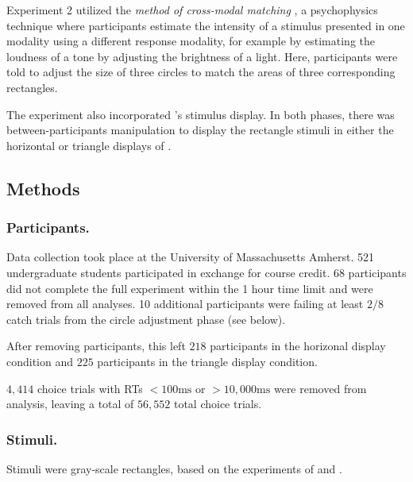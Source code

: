 Experiment 2 utilized the \textit{method of cross-modal matching} \parencite{stevensCrossmodalityMatchingBrightness1965}, a psychophysics technique where participants estimate the intensity of a stimulus presented in one modality using a different response modality, for example by estimating the loudness of a tone by adjusting the brightness of a light. Here, participants were told to adjust the size of three circles to match the areas of three corresponding rectangles. 

The experiment also incorporated \textcite{spektorWhenGoodLooks2018b}'s stimulus display. In both phases, there was between-participants manipulation to display the rectangle stimuli in either the horizontal or triangle displays of \textcite{spektorWhenGoodLooks2018b}.

\subsection{Methods}
\subsubsection{Participants.}
Data collection took place at the University of Massachusetts Amherst. 521 undergraduate students participated in exchange for course credit. 68 participants did not complete the full experiment within the 1 hour time limit and were removed from all analyses. 10 additional participants were failing at least $2/8$ catch trials from the circle adjustment phase (see below). 

After removing participants, this left $218$ participants in the horizonal display condition and $225$ participants in the triangle display condition. 

$4,414$ choice trials with RTs $<100\text{ms}$ or $>10,000\text{ms}$ were removed from analysis, leaving a total of $56,552$ total choice trials.

\subsubsection{Stimuli.}
Stimuli were gray-scale rectangles, based on the experiments of \textcite{spektorWhenGoodLooks2018b} and \textcite{trueblood2013not}. 

